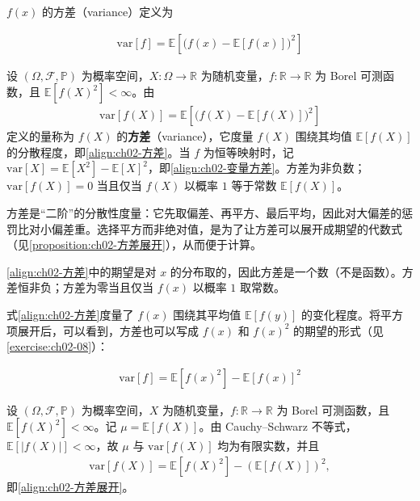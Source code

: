 \documentclass[../../main.tex]{subfiles}
\begin{document}
$f(x)$ 的方差（variance）定义为

\begin{align}
  \mathrm{var}[f] = \mathbb{E}\left[\big(f(x)-\mathbb{E}[f(x)]\big)^{2}\right]
  \label{align:ch02-方差}
\end{align}

\begin{definition}[方差]\label{definition:ch02-方差}
设 $(\Omega,\mathcal{F},\mathbb{P})$ 为概率空间，$X:\Omega\to\mathbb{R}$ 为随机变量，$f:\mathbb{R}\to\mathbb{R}$ 为 Borel 可测函数，且 $\mathbb{E}[f(X)^{2}]<\infty$。由
\begin{align*}
  \mathrm{var}[f(X)]=\mathbb{E}\left[\big(f(X)-\mathbb{E}[f(X)]\big)^{2}\right]
\end{align*}
定义的量称为 $f(X)$ 的\textbf{方差}（variance），它度量 $f(X)$ 围绕其均值 $\mathbb{E}[f(X)]$ 的分散程度，即\eqref{align:ch02-方差}。当 $f$ 为恒等映射时，记 $\mathrm{var}[X]=\mathbb{E}[X^{2}]-\mathbb{E}[X]^{2}$，即\eqref{align:ch02-变量方差}。方差为非负数；$\mathrm{var}[f(X)]=0$ 当且仅当 $f(X)$ 以概率 $1$ 等于常数 $\mathbb{E}[f(X)]$。
\end{definition}

\begin{remark}
方差是“二阶”的分散性度量：它先取偏差、再平方、最后平均，因此对大偏差的惩罚比对小偏差重。选择平方而非绝对值，是为了让方差可以展开成期望的代数式（见\cref{proposition:ch02-方差展开}），从而便于计算。

\eqref{align:ch02-方差}中的期望是对 $x$ 的分布取的，因此方差是一个数（不是函数）。方差恒非负；方差为零当且仅当 $f(x)$ 以概率 $1$ 取常数。
\end{remark}

式\eqref{align:ch02-方差}度量了 $f(x)$ 围绕其平均值 $\mathbb{E}[f(y)]$ 的变化程度。将平方项展开后，可以看到，方差也可以写成 $f(x)$ 和 $f(x)^2$ 的期望的形式（见\cref{exercise:ch02-08}）：

\begin{align}
  \mathrm{var}[f] = \mathbb{E}\left[f(x)^{2}\right] - \mathbb{E}\left[f(x)\right]^{2}
  \label{align:ch02-方差展开}
\end{align}

\begin{proposition}[方差的展开式]\label{proposition:ch02-方差展开}
设 $(\Omega,\mathcal{F},\mathbb{P})$ 为概率空间，$X$ 为随机变量，$f:\mathbb{R}\to\mathbb{R}$ 为 Borel 可测函数，且 $\mathbb{E}[f(X)^{2}]<\infty$。记 $\mu=\mathbb{E}[f(X)]$。由 Cauchy–Schwarz 不等式，$\mathbb{E}[|f(X)|]<\infty$，故 $\mu$ 与 $\mathrm{var}[f(X)]$ 均为有限实数，并且
\begin{align*}
  \mathrm{var}[f(X)]=\mathbb{E}\left[f(X)^{2}\right]-\left(\mathbb{E}[f(X)]\right)^{2},
\end{align*}
即\eqref{align:ch02-方差展开}。
\end{proposition}
\end{document}
